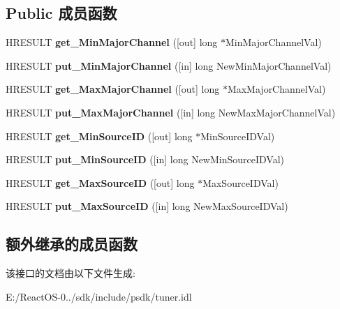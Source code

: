 \subsection*{Public 成员函数}
\begin{DoxyCompactItemize}
\item 
\mbox{\label{interface_i_digital_cable_tuning_space_ab2f42f897fd6bd7ebeb82bed9cac01ae}} 
H\+R\+E\+S\+U\+LT {\bfseries get\+\_\+\+Min\+Major\+Channel} (\mbox{[}out\mbox{]} long $\ast$Min\+Major\+Channel\+Val)
\item 
\mbox{\label{interface_i_digital_cable_tuning_space_aae9c27717c96d825a984ecd484da18a4}} 
H\+R\+E\+S\+U\+LT {\bfseries put\+\_\+\+Min\+Major\+Channel} (\mbox{[}in\mbox{]} long New\+Min\+Major\+Channel\+Val)
\item 
\mbox{\label{interface_i_digital_cable_tuning_space_a69441975747ab2fc4ad57112448a1c47}} 
H\+R\+E\+S\+U\+LT {\bfseries get\+\_\+\+Max\+Major\+Channel} (\mbox{[}out\mbox{]} long $\ast$Max\+Major\+Channel\+Val)
\item 
\mbox{\label{interface_i_digital_cable_tuning_space_af9e5587e354483f183e424135360f3d8}} 
H\+R\+E\+S\+U\+LT {\bfseries put\+\_\+\+Max\+Major\+Channel} (\mbox{[}in\mbox{]} long New\+Max\+Major\+Channel\+Val)
\item 
\mbox{\label{interface_i_digital_cable_tuning_space_a51d59e1c45aef4595477af76e3d76dc4}} 
H\+R\+E\+S\+U\+LT {\bfseries get\+\_\+\+Min\+Source\+ID} (\mbox{[}out\mbox{]} long $\ast$Min\+Source\+I\+D\+Val)
\item 
\mbox{\label{interface_i_digital_cable_tuning_space_a7f039035cbb10e999a7d8acf5c2b7954}} 
H\+R\+E\+S\+U\+LT {\bfseries put\+\_\+\+Min\+Source\+ID} (\mbox{[}in\mbox{]} long New\+Min\+Source\+I\+D\+Val)
\item 
\mbox{\label{interface_i_digital_cable_tuning_space_a68563382c14266660a9811ee0689b56e}} 
H\+R\+E\+S\+U\+LT {\bfseries get\+\_\+\+Max\+Source\+ID} (\mbox{[}out\mbox{]} long $\ast$Max\+Source\+I\+D\+Val)
\item 
\mbox{\label{interface_i_digital_cable_tuning_space_a6db8f1a433ae16a4c3b3c32a6eed06d7}} 
H\+R\+E\+S\+U\+LT {\bfseries put\+\_\+\+Max\+Source\+ID} (\mbox{[}in\mbox{]} long New\+Max\+Source\+I\+D\+Val)
\end{DoxyCompactItemize}
\subsection*{额外继承的成员函数}


该接口的文档由以下文件生成\+:\begin{DoxyCompactItemize}
\item 
E\+:/\+React\+O\+S-\/0../sdk/include/psdk/tuner.\+idl\end{DoxyCompactItemize}

